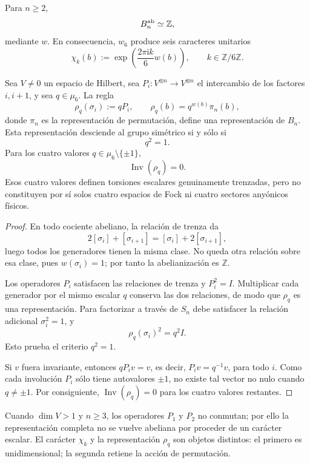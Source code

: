 \begin{theorem}
\label{thm:trenzas-caracteres-z6}
Para \(n\geq2\),
\[
 B_n^{\rm ab}\simeq\mathbb Z,
\]
mediante \(w\). En consecuencia, \(w_6\) produce seis caracteres unitarios
\[
 \chi_k(b)
 :=\exp\!\left(\frac{2\pi\mathrm i k}{6}w(b)\right),
 \qquad k\in\mathbb Z/6\mathbb Z.
\]

Sea \(V\ne0\) un espacio de Hilbert, sea
\(P_i:V^{\otimes n}\to V^{\otimes n}\) el intercambio de los factores
\(i,i+1\), y sea \(q\in\mu_6\). La regla
\[
 \rho_q(\sigma_i):=qP_i,
 \qquad
 \rho_q(b)=q^{w(b)}\pi_n(b),
\]
donde \(\pi_n\) es la representación de permutación, define una
representación de \(B_n\). Esta representación desciende al grupo simétrico
si y sólo si
\[
 q^2=1.
\]
Para los cuatro valores \(q\in\mu_6\setminus\{\pm1\}\),
\[
 \operatorname{Inv}(\rho_q)=0.
\]
Esos cuatro valores definen torsiones escalares genuinamente trenzadas, pero
no constituyen por sí solos cuatro espacios de Fock ni cuatro sectores
anyónicos físicos.
\end{theorem}

\begin{proof}
En todo cociente abeliano, la relación de trenza da
\[
 2[\sigma_i]+[\sigma_{i+1}]
 =[\sigma_i]+2[\sigma_{i+1}],
\]
luego todos los generadores tienen la misma clase. No queda otra relación
sobre esa clase, pues \(w(\sigma_i)=1\); por tanto la abelianización es
\(\mathbb Z\).

Los operadores \(P_i\) satisfacen las relaciones de trenza y
\(P_i^2=I\). Multiplicar cada generador por el mismo escalar \(q\) conserva
las dos relaciones, de modo que \(\rho_q\) es una representación. Para
factorizar a través de \(S_n\) debe satisfacer la relación adicional
\(\sigma_i^2=1\), y
\[
 \rho_q(\sigma_i)^2=q^2I.
\]
Esto prueba el criterio \(q^2=1\).

Si \(v\) fuera invariante, entonces
\(qP_i v=v\), es decir, \(P_i v=q^{-1}v\), para todo \(i\). Como cada
involución \(P_i\) sólo tiene autovalores \(\pm1\), no existe tal vector no
nulo cuando \(q\ne\pm1\). Por consiguiente,
\(\operatorname{Inv}(\rho_q)=0\) para los cuatro valores restantes.
\end{proof}

Cuando \(\dim V>1\) y \(n\geq3\), los operadores \(P_1\) y \(P_2\) no
conmutan; por ello la representación completa no se vuelve abeliana por
proceder de un carácter escalar. El carácter \(\chi_k\) y la representación
\(\rho_q\) son objetos distintos: el primero es unidimensional; la segunda
retiene la acción de permutación.

